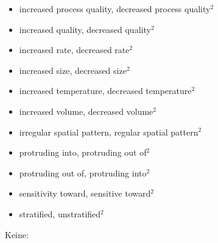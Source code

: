 \begin{itemize}
  \item increased process quality, decreased process quality$^2$
  \item increased quality, decreased quality$^2$
  \item increased rate, decreased rate$^2$
  \item increased size, decreased size$^2$
  \item increased temperature, decreased temperature$^2$
  \item increased volume, decreased volume$^2$
  \item irregular spatial pattern, regular spatial pattern$^2$
  \item protruding into, protruding out of$^2$
  \item protruding out of, protruding into$^2$
  \item sensitivity toward, sensitive toward$^2$
  \item stratified, unstratified$^2$
\end{itemize}
Keine:
